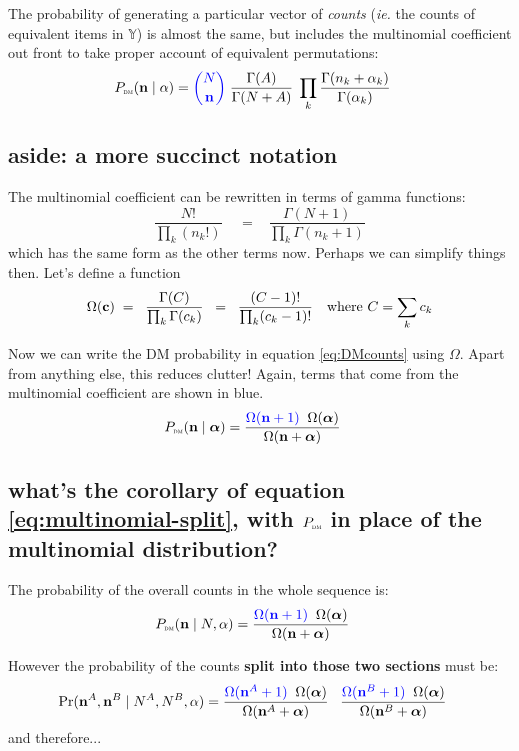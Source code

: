 \documentclass[12pt]{article}
\begin{document}
The probability of generating a particular vector of {\it counts}
({\it ie.} the counts of equivalent items in $\mathbb{Y}$) is almost
the same, but includes the multinomial coefficient out front to take
proper account of equivalent permutations:
\begin{align}
P_\text{\tiny\sc dm}(\mathbf{n} \mid\alpha) &= {\color{blue} {N \choose \ensuremath{\mathbf{n}}}} \;
 \frac{\Gamma(A)}{\Gamma(N+A)} \;\prod_k \frac{\Gamma(n_k+\alpha_k)}{\Gamma(\alpha_k)}  \label{eq:DMcounts}
\end{align}

\subsection{aside: a more succinct notation}

The multinomial coefficient can be rewritten in terms of gamma functions:
\[
\frac{N!}{\prod_k (n_k!)} \;
\;\;\; = \;\;\; 
\frac{\Gamma(N+1)}{\prod_k \Gamma(n_k+1)}
\]
which has the same form as the other terms now.
Perhaps we can simplify things then. Let's define a function
\begin{align}
  \label{eq:omega}
 \Omega(\mathbf{c}) \;&= \;\;\frac{\Gamma(C)}{\prod_k \Gamma(c_k)} \;\;=\;\; \frac{(C-1)!}{\prod_k (c_k-1)! } & \text{where $C=\sum_k c_k$}
\end{align}

Now we can write the DM probability in equation \ref{eq:DMcounts}
using $\Omega$. Apart from anything else, this reduces clutter!
Again, terms that come from the multinomial coefficient are shown in
{\color{blue}blue}.
\begin{align}
P_\text{\tiny\sc dm}(\mathbf{n} \mid\boldsymbol\alpha) &= 
\frac{{\color{blue}\Omega(\mathbf{n}+1)} \;\; \Omega(\boldsymbol\alpha)}{ \Omega(\mathbf{n} + \boldsymbol\alpha)}
\label{eq:DMcounts_inOmega}
\end{align}


\subsection{what's the corollary of equation \ref{eq:multinomial-split}, with $P_\text{\tiny\sc dm}$ in place of the multinomial distribution?}

The probability of the overall counts in the whole sequence is:
\begin{align*}
P_\text{\tiny\sc dm}(\mathbf{n} \mid N,\alpha) &=  \frac{{\color{blue}\Omega(\mathbf{n}+1)} \;\; \Omega(\boldsymbol\alpha)}{ \Omega(\mathbf{n} + \boldsymbol\alpha)}
\end{align*}

However the probability of the counts {\bf split into those two sections} must be:
\begin{align*}
  \Pr(\mathbf{n}^A, \mathbf{n}^B\mid N^A,N^B,\alpha) &=  
\frac{{\color{blue}\Omega(\mathbf{n}^A+1)} \;\; \Omega(\boldsymbol\alpha)}{ \Omega(\mathbf{n}^A + \boldsymbol\alpha)}
\;\;\; \frac{{\color{blue}\Omega(\mathbf{n}^B+1)} \;\; \Omega(\boldsymbol\alpha)}{ \Omega(\mathbf{n}^B + \boldsymbol\alpha)}
\end{align*}
and therefore...
\end{document}
